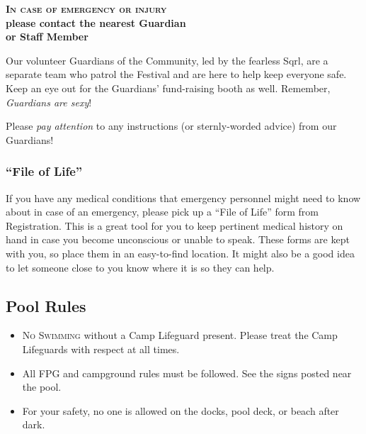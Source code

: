 \documentclass[9pt,twoside,openright,final,article,letterpaper]{memoir}
\renewcommand{\pfbreakdisplay}{%
  \needspace{24pt}%
  \vspace{8pt}\\\ding{76}\quad\ding{77}\quad\ding{78}\\%
  \vspace{11pt}}
\let\oldsubsection=\subsection
\renewcommand{\subsection}[1]{%
  \vspace{6pt}
  \needspace{1.25in}
  \oldsubsection{#1}
  \nopagebreak}
\let\oldsubsubsection=\subsubsection
\renewcommand{\subsubsection}[1]{%
  \needspace{.75in}
  \oldsubsubsection{#1}
  \nopagebreak}
\begin{document}
\begin{multicols}{2}

  \begin{center}
    \textbf{\large \textsc{In case of emergency or injury} \\ please contact the
      nearest Guardian \\ or Staff Member}
  \end{center}

  Our volunteer Guardians of the Community, led by the fearless Sqrl,
  are a separate team who patrol the Festival and are here to help keep
  everyone safe. Keep an eye out for the Guardians' fund-raising booth
  as well. Remember, \emph{Guardians are sexy}!

  Please \emph{pay attention} to any instructions (or sternly-worded
  advice) from our Guardians!


  \subsubsection{``File of Life''}

  If you have any medical conditions that emergency personnel might
  need to know about in case of an emergency, please pick up a ``File
  of Life'' form from Registration. This is a great tool for you to
  keep pertinent medical history on hand in case you become
  unconscious or unable to speak. These forms are kept with you, so
  place them in an easy-to-find location. It might also be a good idea
  to let someone close to you know where it is so they can help.

  \subsection{Pool Rules}

  \begin{itemize}
  \item \textsc{No Swimming} without a Camp Lifeguard present.
    Please treat the Camp Lifeguards with respect at all times.
  \item All FPG and campground rules must be followed. See the signs
    posted near the pool.
  \item For your safety, no one is allowed on the docks, pool deck,
    or beach after dark.
  \end{itemize}



\end{multicols}
\end{document}
